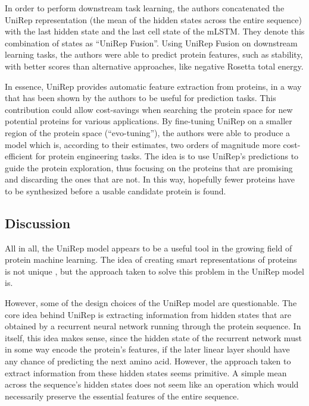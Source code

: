 \documentclass[a4paper,12pt]{article}
\begin{document}
In order to perform downstream task learning, the authors concatenated the UniRep representation (the mean of the hidden states across the entire sequence) with the last hidden state and the last cell state of the mLSTM. They denote this combination of states as ``UniRep Fusion''. Using UniRep Fusion on downstream learning tasks, the authors were able to predict protein features, such as stability, with better scores than alternative approaches, like negative Rosetta total energy.

In essence, UniRep provides automatic feature extraction from proteins, in a way that has been shown by the authors to be useful for prediction tasks. This contribution could allow cost-savings when searching the protein space for new potential proteins for various applications.  By fine-tuning UniRep on a smaller region of the protein space (``evo-tuning''), the authors were able to produce a model which is, according to their estimates, two orders of magnitude more cost-efficient for protein engineering tasks. The idea is to use UniRep's predictions to guide the protein exploration, thus focusing on the proteins that are promising and discarding the ones that are not. In this way, hopefully fewer proteins have to be synthesized before a usable candidate protein is found.

\subsection{Discussion}
All in all, the UniRep model appears to be a useful tool in the growing field of protein machine learning. The idea of creating smart representations of proteins is not unique , but the approach taken to solve this problem in the UniRep model is.

However, some of the design choices of the UniRep model are questionable. The core idea behind UniRep is extracting information from hidden states that are obtained by a recurrent neural network running through the protein sequence. In itself, this idea makes sense, since the hidden state of the recurrent network must in some way encode the protein's features, if the later linear layer should have any chance of predicting the next amino acid. However, the approach taken to extract information from these hidden states seems primitive. A simple mean across the sequence's hidden states does not seem like an operation which would necessarily preserve the essential features of the entire sequence.
\end{document}
